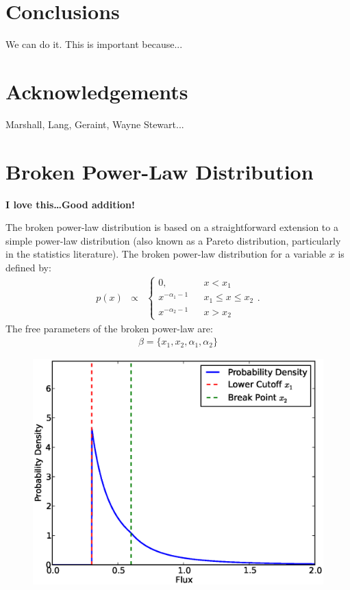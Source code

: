 \documentclass[letterpaper, 11pt]{article}
\begin{document}
\section{Conclusions}
We can do it. This is important because...

\section{Acknowledgements}
Marshall, Lang, Geraint, Wayne Stewart...


\appendix

\section{Broken Power-Law Distribution}\label{power_law}

{\bf I love this\ldots Good addition!}

The broken power-law distribution is based on a straightforward extension
to a simple power-law distribution (also known as a Pareto distribution,
particularly in the statistics literature).
The broken power-law distribution for a variable $x$ is defined by:
\begin{eqnarray}
p(x) &\propto&
\left\{
\begin{array}{lcr}
0, & & x < x_1 \\
x^{-\alpha_1 - 1} & & x_1 \leq x \leq x_2 \\
x^{-\alpha_2 - 1} & & x > x_2
\end{array}
\right.
.
\end{eqnarray}
The free parameters of the broken power-law are:
\begin{eqnarray}
\beta = \{x_1, x_2, \alpha_1, \alpha_2\}
\end{eqnarray}

\begin{figure}
\begin{center}
\includegraphics[scale=0.7]{Figures/broken.eps}
\end{center}
\end{figure}
\end{document}

